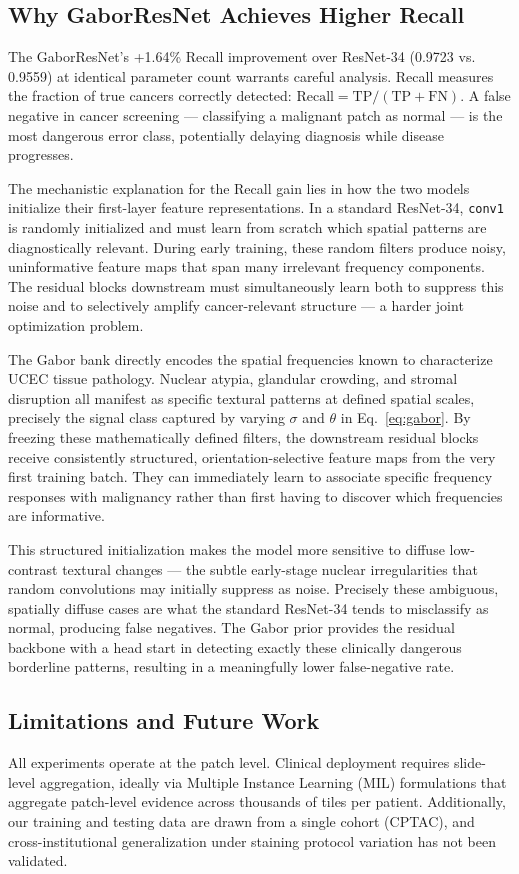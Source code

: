 \documentclass[conference]{IEEEtran}
\begin{document}
\subsection{Why GaborResNet Achieves Higher Recall}
The GaborResNet's +1.64\% Recall improvement over ResNet-34 (0.9723 vs. 0.9559) at identical parameter count warrants careful analysis. Recall measures the fraction of true cancers correctly detected: $\text{Recall} = \text{TP} / (\text{TP} + \text{FN})$. A false negative in cancer screening — classifying a malignant patch as normal — is the most dangerous error class, potentially delaying diagnosis while disease progresses.

The mechanistic explanation for the Recall gain lies in how the two models initialize their first-layer feature representations. In a standard ResNet-34, \texttt{conv1} is randomly initialized and must learn from scratch which spatial patterns are diagnostically relevant. During early training, these random filters produce noisy, uninformative feature maps that span many irrelevant frequency components. The residual blocks downstream must simultaneously learn both to suppress this noise and to selectively amplify cancer-relevant structure — a harder joint optimization problem.

The Gabor bank directly encodes the spatial frequencies known to characterize UCEC tissue pathology. Nuclear atypia, glandular crowding, and stromal disruption all manifest as specific textural patterns at defined spatial scales, precisely the signal class captured by varying $\sigma$ and $\theta$ in Eq.~\ref{eq:gabor}. By freezing these mathematically defined filters, the downstream residual blocks receive consistently structured, orientation-selective feature maps from the very first training batch. They can immediately learn to associate specific frequency responses with malignancy rather than first having to discover which frequencies are informative.

This structured initialization makes the model more sensitive to diffuse low-contrast textural changes — the subtle early-stage nuclear irregularities that random convolutions may initially suppress as noise. Precisely these ambiguous, spatially diffuse cases are what the standard ResNet-34 tends to misclassify as normal, producing false negatives. The Gabor prior provides the residual backbone with a head start in detecting exactly these clinically dangerous borderline patterns, resulting in a meaningfully lower false-negative rate.

\subsection{Limitations and Future Work}
All experiments operate at the patch level. Clinical deployment requires slide-level aggregation, ideally via Multiple Instance Learning (MIL) formulations that aggregate patch-level evidence across thousands of tiles per patient. Additionally, our training and testing data are drawn from a single cohort (CPTAC), and cross-institutional generalization under staining protocol variation has not been validated.
\end{document}
